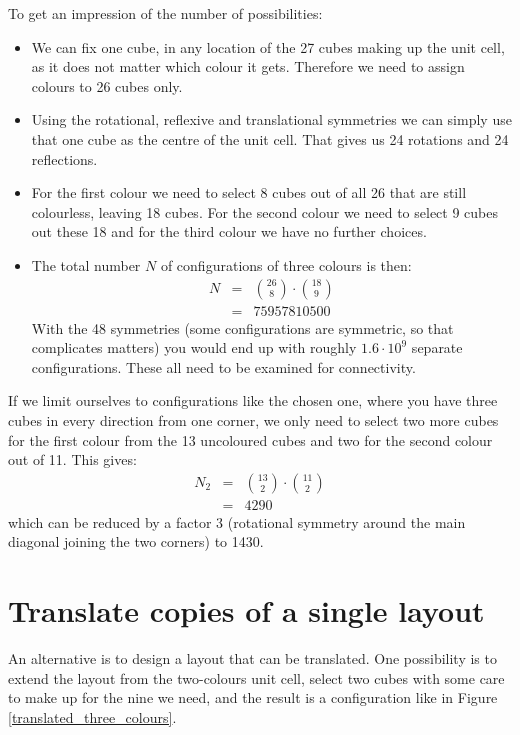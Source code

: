 \documentclass[onecolumn]{article}
\begin{document}
To get an impression of the number of possibilities:
\begin{itemize}
\item
We can fix one cube, in any location of the 27 cubes making up the unit cell, as it does not
matter which colour it gets. Therefore we need to assign colours to 26 cubes only.
\item
Using the rotational, reflexive and translational symmetries we can simply use that one
cube as the centre of the unit cell. That gives us 24 rotations and 24 reflections.
\item
For the first colour we need to select 8 cubes out of all 26 that are still colourless, leaving 18 cubes.
For the second colour we need to select 9 cubes out these 18 and for the third colour we have no
further choices.
\item
The total number $N$ of configurations of three colours is then:
\begin{eqnarray*}
    N &=& \binom{26}{8} \cdot \binom{18}{9} \\
      &=& 75957810500
\end{eqnarray*}
With the 48 symmetries (some configurations are symmetric, so that complicates matters) you
would end up with roughly $1.6 \cdot 10^9$ separate configurations. These all need to be examined
for connectivity.
\end{itemize}

If we limit ourselves to configurations like the chosen one, where you have three cubes in every direction
from one corner, we only need to select two more cubes for the first colour from the 13 uncoloured cubes and
two for the second colour out of 11. This gives:
\begin{eqnarray*}
    N_2 &=& \binom{13}{2} \cdot \binom{11}{2} \\
        &=& 4290
\end{eqnarray*}
\noindent which can be reduced by a factor 3 (rotational symmetry around the main diagonal joining the
two corners) to 1430.


\section*{Translate copies of a single layout}
An alternative is to design a layout that can be translated. One possibility is to extend
the layout from the two-colours unit cell, select two cubes with some care to make up for the
nine we need, and the result is a configuration like in Figure \ref{translated_three_colours}.
\end{document}
